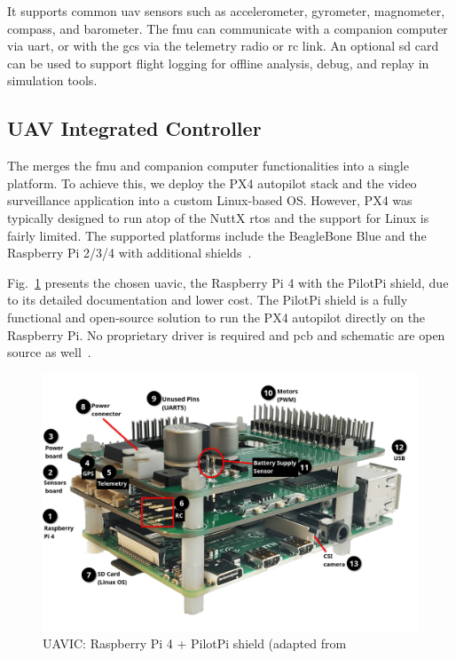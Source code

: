 It supports common \gls{uav} sensors such as accelerometer, gyrometer,
magnometer, compass, and barometer.
The \gls{fmu} can communicate with a companion computer via \gls{uart}, or with
the \gls{gcs} via the telemetry radio or \gls{rc} link. An optional \gls{sd}
card can be used to support flight logging for offline analysis, debug, and
replay in simulation tools.

\subsection{UAV Integrated Controller}
\label{sec:uav-integr-contr}
The  merges the \gls{fmu} and companion computer functionalities
into a single platform. To achieve this, we deploy the PX4 autopilot stack and
the video surveillance application into a custom Linux-based OS. However, PX4 was
typically designed to run atop of the NuttX \gls{rtos} and the support for Linux
is fairly limited. The supported platforms include the BeagleBone Blue and the
Raspberry Pi 2/3/4 with additional
shields~\cite{px4-experimental-autopilot}. 

Fig.~\ref{fig:pilotpi-annot} presents the chosen \gls{uavic}, the Raspberry Pi
4 with the PilotPi shield, due to its detailed documentation and lower
cost. The PilotPi shield is a fully functional and open-source solution to run
the PX4 autopilot directly on the Raspberry Pi. No proprietary driver is
required and \gls{pcb} and schematic are open source as well~\cite{px4-pilotpi}.

\begin{figure}[!hbt]
  \centering
  \includegraphics[width=1.0\textwidth]{./img/png/pilotpi-annotated} 
  \caption[UAVIC: Raspberry Pi 4 + PilotPi shield]{UAVIC: Raspberry Pi 4 +
    PilotPi shield (adapted from~\cite{px4-pilotpi}\footnotemark}%
  \label{fig:pilotpi-annot}
\end{figure}
%
%

